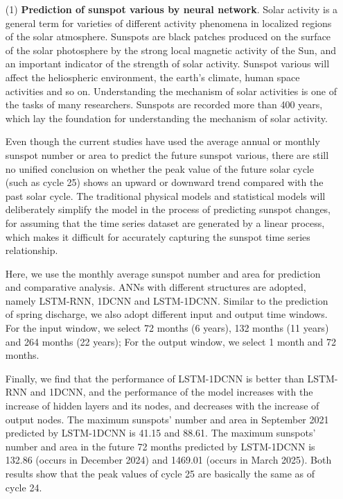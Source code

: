 \begin{enumerate}

  \item[(1)] \textbf{Prediction of sunspot various by neural network}. Solar activity is a general term for varieties of different activity phenomena in localized regions of the solar atmosphere. Sunspots are black patches produced on the surface of the solar photosphere by the strong local magnetic activity of the Sun, and an important indicator of the strength of solar activity. Sunspot various will affect the heliospheric environment, the earth's climate, human space activities and so on. Understanding the mechanism of solar activities is one of the tasks of many researchers. Sunspots are recorded more than 400 years, which lay the foundation for understanding the mechanism of solar activity. 
 
  Even though the current studies have used the average annual or monthly sunspot number or area to predict the future sunspot various, there are still no unified conclusion on whether the peak value of the future solar cycle (such as cycle 25) shows an upward or downward trend compared with the past solar cycle. The traditional physical models and statistical models will deliberately simplify the model in the process of predicting sunspot changes, for assuming that the time series dataset are generated by a linear process, which makes it difficult for accurately capturing the sunspot time series relationship.

  Here, we use the monthly average sunspot number and area for prediction and comparative analysis. ANNs with different structures are adopted, namely LSTM-RNN, 1DCNN and LSTM-1DCNN. Similar to the prediction of spring discharge, we also adopt different input and output time windows. For the input window, we select 72 months (6 years), 132 months (11 years) and 264 months (22 years);  For the output window, we select 1 month and 72 months.

  Finally, we find that the performance of LSTM-1DCNN is better than LSTM-RNN and 1DCNN, and the performance of the model increases with the increase of hidden layers and its nodes, and decreases with the increase of output nodes. The maximum sunspots' number and area in September 2021 predicted by LSTM-1DCNN is 41.15 and 88.61. The maximum sunspots' number and area in the future 72 months predicted by LSTM-1DCNN is 132.86 (occurs in December 2024) and 1469.01 (occurs in March 2025). Both results show that the peak values of cycle 25 are basically the same as of cycle 24. 


\end{enumerate}
